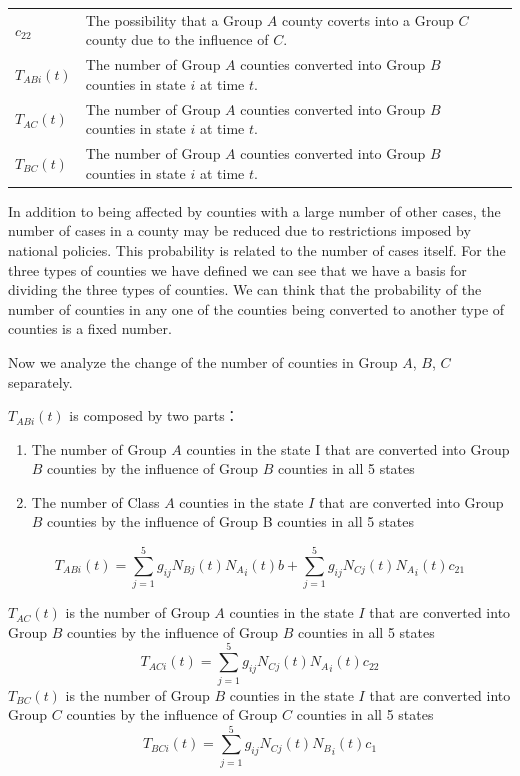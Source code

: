 \documentclass{mcmthesis}
\begin{document}
\begin{table}[H]
\begin{tabular}{lp{12cm}p{12cm}p{12cm}}
$ {c_22}$& The possibility that a Group $A$ county coverts into a Group $C$ county due to the influence of $C$.\\

${T_{ABi}}(t)$&The number of Group $A$ counties converted into Group $B$ counties in state $i$ at time $t$. \\

${T_{AC}}(t)$& The number of Group $A$ counties converted into Group $B$ counties in state $i$ at time $t$.\\

${T_{BC}}(t)$& The number of Group $A$ counties converted into Group $B$ counties in state $i$ at time $t$.\\
    \bottomrule
    \end{tabular}%
  \label{tab:results of the total number of Total Drug Reports over 5000}%
\end{table}%


In addition to being affected by counties with a large number of other cases, the number of cases in a county may be reduced due to restrictions imposed by national policies. This probability is related to the number of cases itself.  For the three types of counties we have defined we can see that we have a basis for dividing the three types of counties. We can think that the probability of the number of counties in any one of the counties being converted to another type of counties is a fixed number.

Now we analyze the change of the number of counties in Group $A$, $B$, $C$ separately.

${T_{ABi}}(t)$ is composed by two parts：
\begin{enumerate}
  \item The number of Group $A$ counties in the state I that are converted into Group $B$ counties by the influence of Group $B$ counties in all 5 states  
  \item The number of Class $A$ counties in the state $I$ that are converted into Group $B$ counties by the influence of Group B counties in all 5 states
\end{enumerate}

 
 \begin{equation}{T_{ABi}}(t) = \sum\limits_{j = 1}^5 {{g_{ij}}{N_{Bj}}(t){N_A}_i(t)} b + \sum\limits_{j = 1}^5 {{g_{ij}}{N_{Cj}}(t)} {N_A}_i(t){c_{21}} \end{equation}

${T_{AC}}(t)$ is the number of Group $A$ counties in the state $I$ that are converted into Group $B$ counties by the influence of Group $B$ counties in all 5 states 
                         \begin{equation}{T_{ACi}}(t) = \sum\limits_{j = 1}^5 {{g_{ij}}{N_{Cj}}(t)} {N_A}_i(t){c_{22}} \end{equation}
${T_{BC}}(t)$ is the number of Group $B$ counties in the state $I$ that are converted into Group $C$ counties by the influence of Group $C$ counties in all 5 states 
  \begin{equation}{T_{BCi}}(t) = \sum\limits_{j = 1}^5 {{g_{ij}}{N_{Cj}}(t)} {N_B}_i(t){c_1} \end{equation}
 
\end{document}
